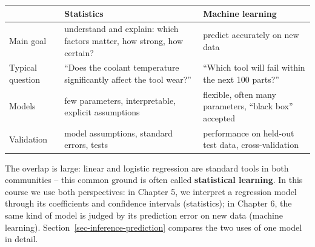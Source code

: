 \documentclass[
  letterpaper,
  DIV=11,
  numbers=noendperiod]{scrreprt}
\begin{document}
\begin{longtable}[]{@{}
  >{\raggedright\arraybackslash}p{}
  >{\raggedright\arraybackslash}p{}
  >{\raggedright\arraybackslash}p{}@{}}
\toprule\noalign{}
\begin{minipage}[b]{\linewidth}\raggedright
\end{minipage} & \begin{minipage}[b]{\linewidth}\raggedright
Statistics
\end{minipage} & \begin{minipage}[b]{\linewidth}\raggedright
Machine learning
\end{minipage} \\
\midrule\noalign{}
\endhead
\bottomrule\noalign{}
\endlastfoot
Main goal & understand and explain: which factors matter, how strong,
how certain? & predict accurately on new data \\
Typical question & ``Does the coolant temperature significantly affect
the tool wear?'' & ``Which tool will fail within the next 100
parts?'' \\
Models & few parameters, interpretable, explicit assumptions & flexible,
often many parameters, ``black box'' accepted \\
Validation & model assumptions, standard errors, tests & performance on
held-out test data, cross-validation \\
\end{longtable}

The overlap is large: linear and logistic regression are standard tools
in both communities -- this common ground is often called
\textbf{statistical learning}. In this course we use both perspectives:
in Chapter 5, we interpret a regression model through its coefficients
and confidence intervals (statistics); in Chapter 6, the same kind of
model is judged by its prediction error on new data (machine learning).
Section~\ref{sec-inference-prediction} compares the two uses of one
model in detail.
\end{document}
